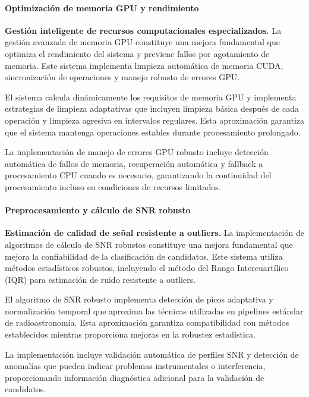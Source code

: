 \paragraph{Optimización de memoria GPU y rendimiento}

\noindent\textbf{Gestión inteligente de recursos computacionales especializados.} La gestión avanzada de memoria GPU constituye una mejora fundamental que optimiza el rendimiento del sistema y previene fallos por agotamiento de memoria. Este sistema implementa limpieza automática de memoria CUDA, sincronización de operaciones y manejo robusto de errores GPU.

El sistema calcula dinámicamente los requisitos de memoria GPU y implementa estrategias de limpieza adaptativas que incluyen limpieza básica después de cada operación y limpieza agresiva en intervalos regulares. Esta aproximación garantiza que el sistema mantenga operaciones estables durante procesamiento prolongado.

La implementación de manejo de errores GPU robusto incluye detección automática de fallos de memoria, recuperación automática y fallback a procesamiento CPU cuando es necesario, garantizando la continuidad del procesamiento incluso en condiciones de recursos limitados.

\paragraph{Preprocesamiento y cálculo de SNR robusto}

\noindent\textbf{Estimación de calidad de señal resistente a outliers.} La implementación de algoritmos de cálculo de SNR robustos constituye una mejora fundamental que mejora la confiabilidad de la clasificación de candidatos. Este sistema utiliza métodos estadísticos robustos, incluyendo el método del Rango Intercuartílico (IQR) para estimación de ruido resistente a outliers.

El algoritmo de SNR robusto implementa detección de picos adaptativa y normalización temporal que aproxima las técnicas utilizadas en pipelines estándar de radioastronomía. Esta aproximación garantiza compatibilidad con métodos establecidos mientras proporciona mejoras en la robustez estadística.

La implementación incluye validación automática de perfiles SNR y detección de anomalías que pueden indicar problemas instrumentales o interferencia, proporcionando información diagnóstica adicional para la validación de candidatos.

